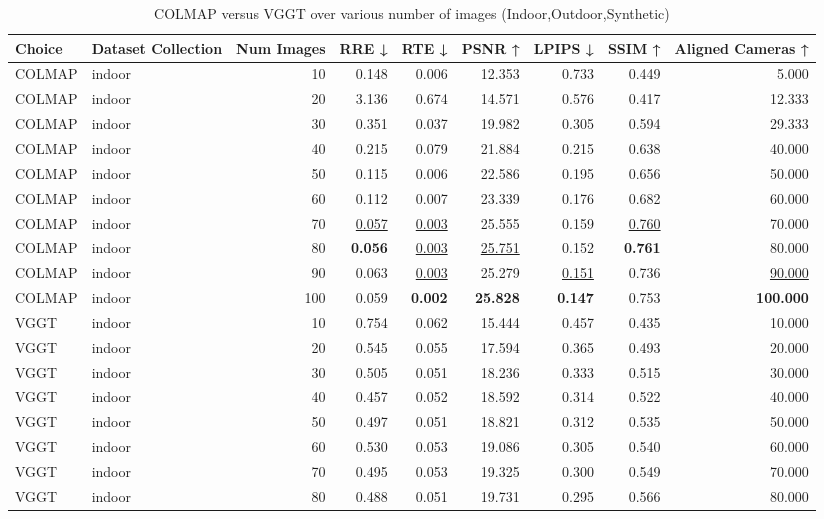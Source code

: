 \begin{table}[H]
\caption{\ifdefined\customcaption \customcaption \else COLMAP versus VGGT over various number of images (Indoor,Outdoor,Synthetic) \fi}
\label{tab:01_num_images_indoor,outdoor,synthetic}
\centering
\scriptsize
\begin{tabular}{llrrrrrrr}
\toprule
Choice & Dataset Collection & Num Images & RRE ↓ & RTE ↓ & PSNR ↑ & LPIPS ↓ & SSIM ↑ & Aligned Cameras ↑ \\
\midrule
COLMAP & indoor & 10 & 0.148 & 0.006 & 12.353 & 0.733 & 0.449 & 5.000 \\
COLMAP & indoor & 20 & 3.136 & 0.674 & 14.571 & 0.576 & 0.417 & 12.333 \\
COLMAP & indoor & 30 & 0.351 & 0.037 & 19.982 & 0.305 & 0.594 & 29.333 \\
COLMAP & indoor & 40 & 0.215 & 0.079 & 21.884 & 0.215 & 0.638 & 40.000 \\
COLMAP & indoor & 50 & 0.115 & 0.006 & 22.586 & 0.195 & 0.656 & 50.000 \\
COLMAP & indoor & 60 & 0.112 & 0.007 & 23.339 & 0.176 & 0.682 & 60.000 \\
COLMAP & indoor & 70 & \underline{0.057} & \underline{0.003} & 25.555 & 0.159 & \underline{0.760} & 70.000 \\
COLMAP & indoor & 80 & \textbf{0.056} & \underline{0.003} & \underline{25.751} & 0.152 & \textbf{0.761} & 80.000 \\
COLMAP & indoor & 90 & 0.063 & \underline{0.003} & 25.279 & \underline{0.151} & 0.736 & \underline{90.000} \\
COLMAP & indoor & 100 & 0.059 & \textbf{0.002} & \textbf{25.828} & \textbf{0.147} & 0.753 & \textbf{100.000} \\
VGGT & indoor & 10 & 0.754 & 0.062 & 15.444 & 0.457 & 0.435 & 10.000 \\
VGGT & indoor & 20 & 0.545 & 0.055 & 17.594 & 0.365 & 0.493 & 20.000 \\
VGGT & indoor & 30 & 0.505 & 0.051 & 18.236 & 0.333 & 0.515 & 30.000 \\
VGGT & indoor & 40 & 0.457 & 0.052 & 18.592 & 0.314 & 0.522 & 40.000 \\
VGGT & indoor & 50 & 0.497 & 0.051 & 18.821 & 0.312 & 0.535 & 50.000 \\
VGGT & indoor & 60 & 0.530 & 0.053 & 19.086 & 0.305 & 0.540 & 60.000 \\
VGGT & indoor & 70 & 0.495 & 0.053 & 19.325 & 0.300 & 0.549 & 70.000 \\
VGGT & indoor & 80 & 0.488 & 0.051 & 19.731 & 0.295 & 0.566 & 80.000 \\

\end{tabular}
\end{table}
